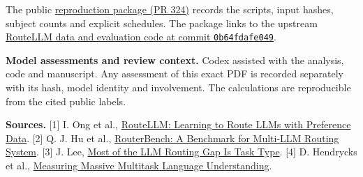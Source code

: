 \documentclass[11pt]{article}
\begin{document}
The public \href{https://github.com/lluiseriksson/THE-ERIKSSON-PROGRAMME/pull/324}{reproduction package (PR 324)} records the scripts, input hashes, subject counts and explicit schedules. The package links to the upstream \href{https://github.com/lm-sys/RouteLLM/tree/0b64fdafe049e596a3f5657c219329f24af24198/routellm/evals}{RouteLLM data and evaluation code at commit \texttt{0b64fdafe049}}.

\textbf{Model assessments and review context.} Codex assisted with the analysis, code and manuscript. Any assessment of this exact PDF is recorded separately with its hash, model identity and involvement. The calculations are reproducible from the cited public labels.

\small
\textbf{Sources.} [1] I. Ong et al., \href{https://arxiv.org/abs/2406.18665}{RouteLLM: Learning to Route LLMs with Preference Data}.
[2] Q. J. Hu et al., \href{https://arxiv.org/abs/2403.12031}{RouterBench: A Benchmark for Multi-LLM Routing System}.
[3] J. Lee, \href{https://arxiv.org/abs/2608.23023}{Most of the LLM Routing Gap Is Task Type}.
[4] D. Hendrycks et al., \href{https://arxiv.org/abs/2009.03300}{Measuring Massive Multitask Language Understanding}.
\end{document}
